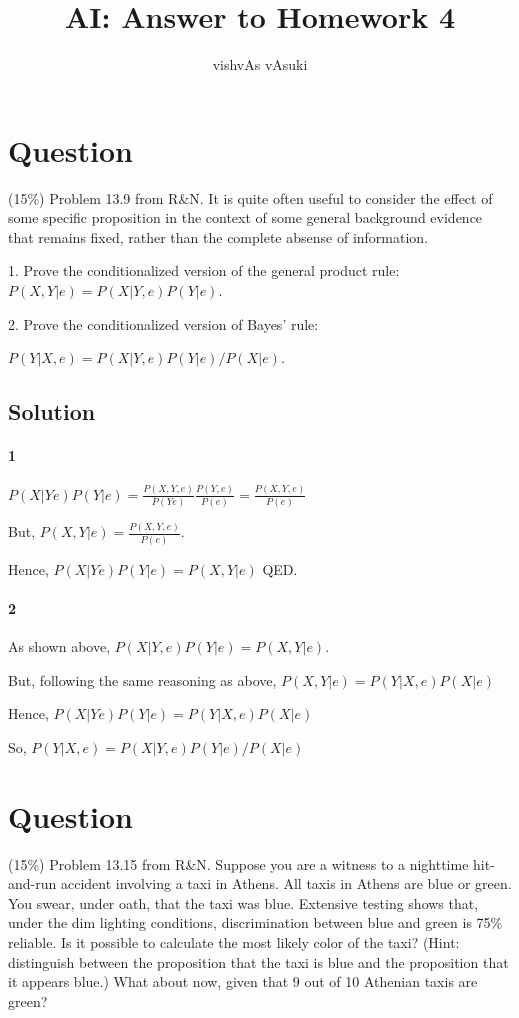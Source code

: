 \documentclass[10pt]{article}
\title{AI: Answer to Homework 4}
\author{vishvAs vAsuki}
\begin{document}
\maketitle

\section{Question}

  (15\%) Problem 13.9 from R\&N. It is quite often useful to consider the effect of some specific proposition in the context of some general background evidence that remains fixed, rather than the complete absense of information.

   1. Prove the conditionalized version of the general product rule: $P(X,Y|e) = P(X|Y,e)P(Y|e)$.

   2. Prove the conditionalized version of Bayes' rule: 

$P(Y|X,e) = P(X|Y,e) P(Y|e) / P(X|e)$. 

\subsection{Solution}

\paragraph{1} $P(X|Ye)P(Y|e)=\frac{P(X,Y,e)}{P(Ye)}\frac{P(Y,e)}{P(e)} = \frac{P(X,Y,e)}{P(e)}$

But, $P(X,Y|e)=\frac{P(X,Y,e)}{P(e)} $.

Hence, $ P(X|Ye)P(Y|e) = P(X,Y|e)$ QED.


\paragraph{2} As shown above, $P(X|Y,e)P(Y|e) = P(X,Y|e)$.

But, following the same reasoning as above, $P(X,Y|e)=P(Y|X,e)P(X|e)$

Hence, $ P(X|Ye)P(Y|e) = P(Y|X,e)P(X|e)$

So, $P(Y|X,e) = P(X|Y,e) P(Y|e) / P(X|e)$

\section{Question}
 (15\%) Problem 13.15 from R\&N. Suppose you are a witness to a nighttime hit-and-run accident involving a taxi in Athens. All taxis in Athens are blue or green. You swear, under oath, that the taxi was blue. Extensive testing shows that, under the dim lighting conditions, discrimination between blue and green is 75\% reliable. Is it possible to calculate the most likely color of the taxi? (Hint: distinguish between the proposition that the taxi is blue and the proposition that it appears blue.)
What about now, given that 9 out of 10 Athenian taxis are green?
\end{document}
